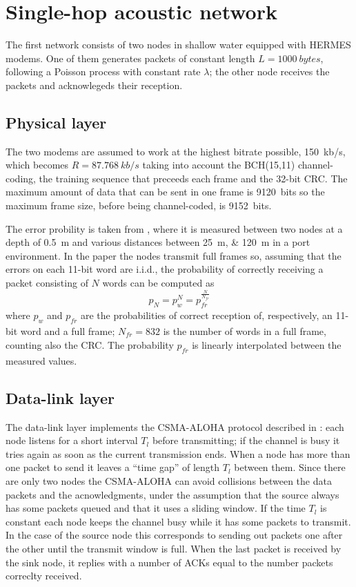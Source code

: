\section{Single-hop acoustic network}
The first network consists of two nodes in shallow water equipped with
HERMES modems. One of them generates packets of constant length
$L=\SI{1000}{bytes}$, following a Poisson process with constant rate
$\lambda$; the other node receives the packets and acknowlegeds their
reception.

\subsection{Physical layer}
The two modems are assumed to work at the highest bitrate possible,
\SI{150}{kb/s}, which becomes $R = \SI{87.768}{kb/s}$ taking into
account the BCH(15,11) channel-coding, the training sequence that
preceeds each frame and the 32-bit CRC.
%
The maximum amount of data that can be sent in one frame
is \SI{9120}{bits} so the maximum frame size, before being
channel-coded, is \SI{9152}{bits}.

The error probility is taken from \cite{hermes}, where it is measured
between two nodes at a depth of \SI{0.5}{\m} and various distances
between \SIlist{25; 120}{\m} in a port environment. In the paper the
nodes transmit full frames so, assuming that the errors on each 11-bit
word are i.i.d., the probability of correctly receiving a packet
consisting of $N$ words can be computed as
\begin{equation}
  p_N = p_w^N = p_{\mathit{fr}}^\frac{N}{N_{\mathit{fr}}}
  \label{eq:pN}
\end{equation}
where $p_w$ and $p_{\mathit{fr}}$ are the probabilities of correct
reception of, respectively, an 11-bit word and a full frame;
$N_{\mathit{fr}} = 832$ is the number of words in a full frame,
counting also the CRC.
%
The probability $p_{\mathit{fr}}$ is linearly interpolated between the
measured values.

\subsection{Data-link layer}
The data-link layer implements the CSMA-ALOHA protocol described in
\cite{proto_issues}: each node listens for a short interval $T_l$
before transmitting; if the channel is busy it tries again as soon as
the current transmission ends. When a node has more than one packet to
send it leaves a ``time gap'' of length $T_l$ between them.
%
Since there are only two nodes the CSMA-ALOHA can avoid collisions
between the data packets and the acnowledgments, under the assumption
that the source always has some packets queued and that it uses a
sliding window. If the time $T_l$ is constant each node keeps the
channel busy while it has some packets to transmit.
%
In the case of the source node this corresponds to sending out packets
one after the other until the transmit window is full. When the last
packet is received by the sink node, it replies with a number of ACKs
equal to the number packets correclty received.

